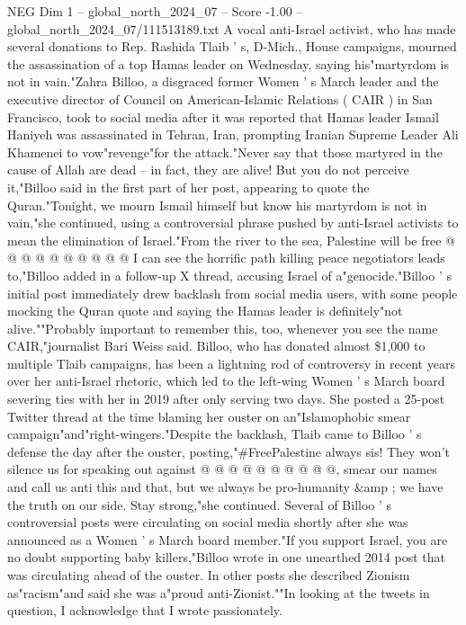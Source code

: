 \begin{textsample}{NEG Dim 1 – global\_north\_2024\_07 – Score -1.00 – global\_north\_2024\_07/111513189.txt}  \label{ex:f1_neg_059}
A vocal anti-Israel activist, who has made several donations to Rep.
Rashida Tlaib ' s, D-Mich., House campaigns, mourned the assassination of a top Hamas leader on Wednesday, saying his"martyrdom is not in vain."Zahra Billoo, a disgraced former Women ' s March leader and the executive director of Council on American-Islamic Relations ( CAIR ) in San Francisco, took to social media after it was reported that Hamas leader Ismail Haniyeh was assassinated in Tehran, Iran, prompting Iranian Supreme Leader Ali Khamenei to vow"revenge"for the attack."Never say that those martyred in the cause of Allah are dead -- in fact, they are alive!
But you do not perceive it,"Billoo said in the first part of her post, appearing to quote the Quran."Tonight, we mourn Ismail himself but know his martyrdom is not in vain,"she continued, using a controversial phrase pushed by anti-Israel activists to mean the elimination of Israel."From the river to the sea, Palestine will be free @ @ @ @ @ @ @ @ @ @ I can see the horrific path killing peace negotiators leads to,"Billoo added in a follow-up X thread, accusing Israel of a"genocide."Billoo ' s initial post immediately drew backlash from social media users, with some people mocking the Quran quote and saying the Hamas leader is definitely"not alive.""Probably important to remember this, too, whenever you see the name CAIR,"journalist Bari Weiss said.
Billoo, who has donated almost \$1,000 to multiple Tlaib campaigns, has been a lightning rod of controversy in recent years over her anti-Israel rhetoric, which led to the left-wing Women ' s March board severing ties with her in 2019 after only serving two days.
She posted a 25-post Twitter thread at the time blaming her ouster on an"Islamophobic smear campaign"and"right-wingers."Despite the backlash, Tlaib came to Billoo ' s defense the day after the ouster, posting,"\#FreePalestine always sis!
They won't silence us for speaking out against @ @ @ @ @ @ @ @ @ @, smear our names and call us anti this and that, but we always be pro-humanity \&amp ; we have the truth on our side.
Stay strong,"she continued.
Several of Billoo ' s controversial posts were circulating on social media shortly after she was announced as a Women ' s March board member."If you support Israel, you are no doubt supporting baby killers,"Billoo wrote in one unearthed 2014 post that was circulating ahead of the ouster.
In other posts she described Zionism as"racism"and said she was a"proud anti-Zionist.""In looking at the tweets in question, I acknowledge that I wrote passionately.

\end{textsample}
